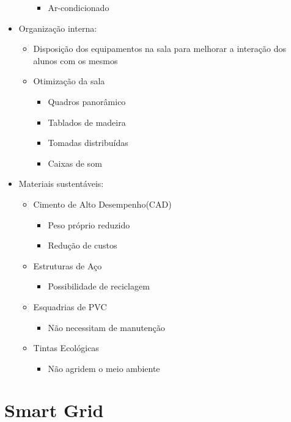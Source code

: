 \begin{apendicesenv}
\begin{itemize}
\begin{itemize}
      \begin{itemize}
      \item Ar-condicionado
      \end{itemize}
    \end{itemize}
    \item Organização interna:
  \begin{itemize}
  \item Disposição dos equipamentos na sala para melhorar a interação dos alunos com os mesmos
    \item Otimização da sala
    \begin{itemize}
    \item Quadros panorâmico
  \item Tablados de madeira
  \item Tomadas distribuídas
  \item Caixas de som
    \end{itemize}
  \end{itemize}
    \item Materiais sustentáveis:
    \begin{itemize}
    \item Cimento de Alto Desempenho(CAD)
    \begin{itemize}
    \item Peso próprio reduzido
  \item Redução de custos
    \end{itemize}
    \item Estruturas de Aço
    \begin{itemize}
    \item Possibilidade de reciclagem
    \end{itemize}
  \item Esquadrias de PVC
    \begin{itemize}
    \item Não necessitam de manutenção
    \end{itemize}
    \item Tintas Ecológicas
    \begin{itemize}
    \item Não agridem o meio ambiente
    \end{itemize}
    \end{itemize}
  \end{itemize}
\section{Smart Grid}


\end{apendicesenv}

